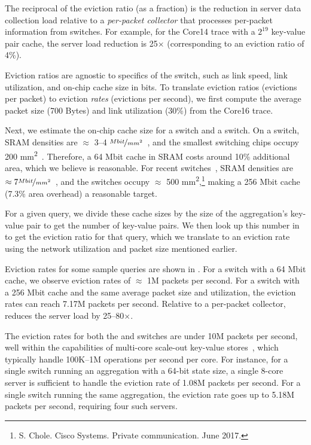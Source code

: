 The reciprocal of the eviction ratio (as a fraction) is the reduction in server
data collection load relative to a {\em per-packet collector} that processes
per-packet information from switches. For example, for the Core14 trace with a
$2^{19}$ key-value pair cache, the server load reduction is 25$\times$
(corresponding to an eviction ratio of 4\%).

Eviction ratios are agnostic to specifics of the switch, such as link speed,
link utilization, and on-chip cache size in bits. To translate
eviction ratios (evictions per packet) to eviction \emph{rates} (evictions per
second), we first compute the average packet size (700 Bytes) and link utilization
(30\%) from the Core16 trace.

Next, we estimate the on-chip cache size for a \tengswitch switch and a
\hundredgswitch switch.
On a \tengswitch switch, SRAM
densities are $\approx$ 3--4 $\nicefrac{Mbit}{mm^2}$~\cite{sram_45nm_wiki}, and
the smallest switching chips occupy 200
\si{\milli\metre\squared}~\cite{gibb_parsing}.  Therefore, a 64 Mbit cache in
SRAM costs around 10\% additional area, which we believe is reasonable.
For recent \hundredgswitch switches~\cite{tomahawk2},
 SRAM densities are $\approx7
\nicefrac{Mbit}{mm^2}$~\cite{sram_estimate}, and the switches occupy
$\approx$ 500 \si{\milli\metre\squared},\footnote{S. Chole. Cisco Systems. Private
communication.  June 2017.} making a 256 Mbit cache (7.3\% area
overhead) a reasonable target.

For a given query, we divide these cache sizes by the size of
the aggregation's key-value pair to get
the number of key-value pairs. We then look up this number in 
to get the eviction ratio for that query, which we translate to an eviction rate
using the network utilization and packet size mentioned earlier.

Eviction rates for some sample queries are shown in .
 For a \tengswitch switch with a 64 Mbit cache, we observe eviction rates of
$\approx$ 1M packets per second.  For a \hundredgswitch switch with a 256 Mbit
cache and the same average packet size and utilization, the eviction rates can
reach
 7.17M packets per second. Relative to a per-packet collector,
\TheSystem reduces the server load by 25--80$\times$.

The eviction rates for both the \tenglink and \hundredglink switches are
under 10M packets per second, well within the capabilities of multi-core
scale-out key-value
stores~\cite{redis_benchmark, memcached_benchmark, redis_vs_memcached_update},
which typically handle 100K--1M operations per second per core.  For instance,
for a single \tengswitch switch running an aggregation with a 64-bit
state size, a single 8-core server is sufficient to handle the eviction rate of
1.08M packets per second. For a single \hundredgswitch switch running
the same aggregation, the eviction rate goes up to 5.18M packets per
second, requiring four such servers.

